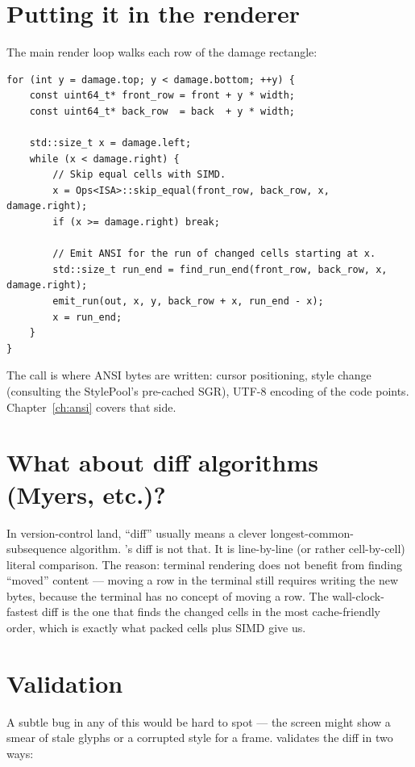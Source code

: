 \section{Putting it in the renderer}

The main render loop walks each row of the damage rectangle:

\begin{lstlisting}
for (int y = damage.top; y < damage.bottom; ++y) {
    const uint64_t* front_row = front + y * width;
    const uint64_t* back_row  = back  + y * width;

    std::size_t x = damage.left;
    while (x < damage.right) {
        // Skip equal cells with SIMD.
        x = Ops<ISA>::skip_equal(front_row, back_row, x, damage.right);
        if (x >= damage.right) break;

        // Emit ANSI for the run of changed cells starting at x.
        std::size_t run_end = find_run_end(front_row, back_row, x, damage.right);
        emit_run(out, x, y, back_row + x, run_end - x);
        x = run_end;
    }
}
\end{lstlisting}

The  call is where ANSI bytes are written: cursor
positioning, style change (consulting the StylePool's pre-cached
SGR), UTF-8 encoding of the code points. Chapter~\ref{ch:ansi} covers
that side.

\section{What about diff algorithms (Myers, etc.)?}

In version-control land, ``diff'' usually means a clever
longest-common-subsequence algorithm. \maya{}'s diff is not that. It
is line-by-line (or rather cell-by-cell) literal comparison. The
reason: terminal rendering does not benefit from finding ``moved''
content --- moving a row in the terminal still requires writing
the new bytes, because the terminal has no concept of moving a row.
The wall-clock-fastest diff is the one that finds the changed cells
in the most cache-friendly order, which is exactly what packed cells
plus SIMD give us.

\section{Validation}

A subtle bug in any of this would be hard to spot --- the screen
might show a smear of stale glyphs or a corrupted style for a frame.
\maya{} validates the diff in two ways:

